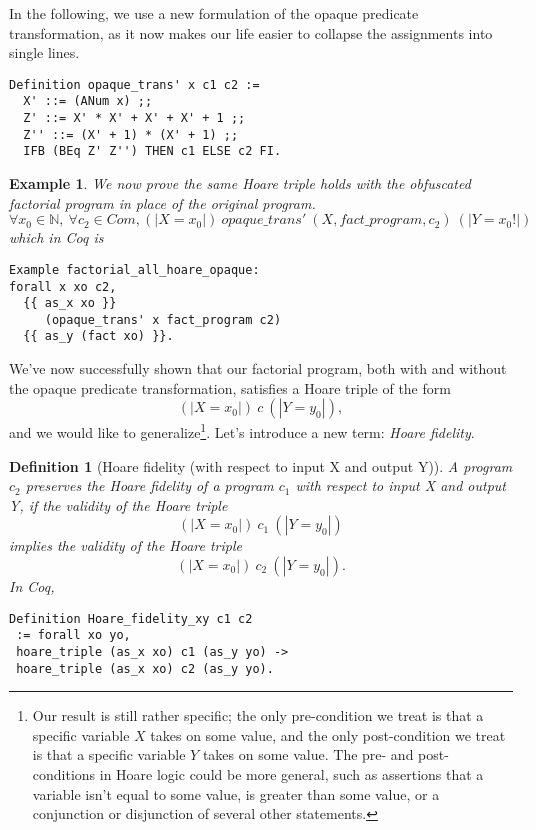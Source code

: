 \documentclass[compsoc,conference,a4paper,10pt,times]{IEEEtran}
\newtheorem{defin}[theorem]{Definition}
\newtheorem{example}[theorem]{Example}
\begin{document}
\par

In the following, we use a new formulation of the opaque predicate transformation, as it now makes our life easier to collapse the assignments into single lines.

\begin{verbatim}
Definition opaque_trans' x c1 c2 :=
  X' ::= (ANum x) ;;
  Z' ::= X' * X' + X' + X' + 1 ;;
  Z'' ::= (X' + 1) * (X' + 1) ;;
  IFB (BEq Z' Z'') THEN c1 ELSE c2 FI.
\end{verbatim}

\begin{example}\label{hoarel2}
    We now prove the same Hoare triple holds with the obfuscated factorial program in place of the original program.
    \[
     \forall x_0 \in \mathbb{N},\ \forall c_2 \in Com, (|X=x_0|)\ opaque\_trans'\ (X, fact\_program, c_2)\ (|Y=x_0!|)
    \]
    which in Coq is
    \begin{verbatim}
Example factorial_all_hoare_opaque: 
forall x xo c2,
  {{ as_x xo }} 
     (opaque_trans' x fact_program c2) 
  {{ as_y (fact xo) }}.\end{verbatim}
\end{example}

We've now successfully shown that our factorial program, both with and without the opaque predicate transformation, satisfies a Hoare triple of the form
\[ (| X = x_0 |)\ c\ (| Y = y_0 |), \]
and we would like to generalize\footnote{Our result is still rather specific; the only pre-condition we treat is that a specific variable $X$ takes on some value, and the only post-condition we treat is that a specific variable $Y$ takes on some value.  The pre- and post- conditions in Hoare logic could be more general, such as assertions that a variable isn't equal to some value, is greater than some value, or a conjunction or disjunction of several other statements.}.  Let's introduce a new term: \emph{Hoare fidelity}.

\begin{defin}[Hoare fidelity (with respect to input X and output Y)]
A program $c_2$ preserves the Hoare fidelity of a program $c_1$ with respect to input X and output Y, if the validity of the Hoare triple
\[
(| X = x_0 |)\ c_1\ (| Y = y_0 |)
\]
implies the validity of the Hoare triple
\[
(| X = x_0 |)\ c_2\ (| Y = y_0 |).
\]
In Coq,
\begin{verbatim}
Definition Hoare_fidelity_xy c1 c2 
 := forall xo yo,
 hoare_triple (as_x xo) c1 (as_y yo) -> 
 hoare_triple (as_x xo) c2 (as_y yo).\end{verbatim}
\end{defin}
\end{document}
